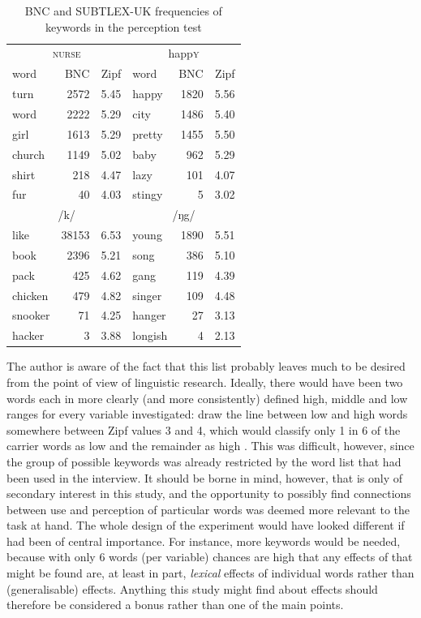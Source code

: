 \begin{table}
	\caption{BNC and SUBTLEX-UK frequencies of keywords in the perception test}
	\label{tab.keywords.frequency}
	
	\begin{tabular}{lrrlrr}
		\toprule
		\multicolumn{3}{c}{\textsc{nurse}} & \multicolumn{3}{c}{happ\textsc{y}}\\
		word & BNC & Zipf\is{Zipf score} & word & BNC & Zipf\is{Zipf score} \\
		\midrule
		turn & 2572 & 5.45 & happy & 1820 & 5.56 \\
		word & 2222 & 5.29 & city & 1486 & 5.40 \\
		girl & 1613 & 5.29 & pretty & 1455 & 5.50 \\			
		church & 1149 & 5.02 & baby & 962 & 5.29 \\
		shirt & 218 & 4.47 & lazy & 101 & 4.07 \\
		fur & 40 & 4.03 & stingy & 5 & 3.02 \\
		\midrule
		\multicolumn{3}{c}{/k/} & \multicolumn{3}{c}{/ŋg/}\\
		\midrule
		like & 38153 & 6.53 & young & 1890 & 5.51\\
		book & 2396 & 5.21 & song & 386 & 5.10\\
		pack & 425 & 4.62 & gang & 119 & 4.39\\
		chicken & 479 & 4.82 & singer & 109 & 4.48\\
		snooker & 71 & 4.25 & hanger & 27 & 3.13\\
		hacker & 3 & 3.88 & longish & 4 & 2.13\\
		\bottomrule
	\end{tabular}
\end{table}

The author is aware of the fact that this list probably leaves much to be desired from the point of view of linguistic  research.
Ideally, there would have been two words each in more clearly (and more consistently) defined high, middle and low  ranges for every variable investigated: \textcite{heuvenetal2014} draw the line between low  and high  words somewhere between Zipf values 3 and 4, which would classify only 1 in 6 of the carrier words as low  and the remainder as high .
This was difficult, however, since the group of possible keywords was already restricted by the word list that had been used in the interview.
It should be borne in mind, however, that  is only of secondary interest in this study, and the opportunity to possibly find connections between use and perception of particular words was deemed more relevant to the task at hand.
The whole design of the experiment would have looked different if  had been of central importance.
For instance, more keywords would be needed, because with only 6 words (per variable) chances are high that any effects of  that might be found are, at least in part, \emph{lexical} effects of individual words rather than (generalisable)  effects.
Anything this study might find about  effects should therefore be considered a bonus rather than one of the main points.

